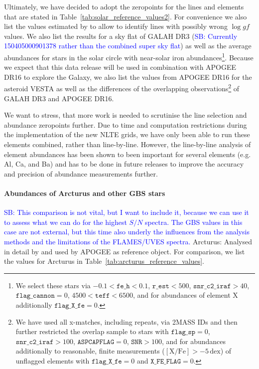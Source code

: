 \documentclass[fleqn,usenatbib,useAMS]{mnras}
\newcommand\SB[1]{\textcolor{blue}{SB: #1}}
\begin{document}
Ultimately, we have decided to adopt the zeropoints for the lines and elements that are stated in Table~\ref{tab:solar_reference_values2}. For convenience we also list the values estimated by \cite{Asplund2009} to allow to identify lines with possibly wrong $\log gf$ values. We also list the results for a sky flat of GALAH DR3 (\SB{Currently 150405000901378 rather than the combined super sky flat}) as well as the average abundances for stars in the solar circle with near-solar iron abundances\footnote{We select these stars via $-0.1 < \texttt{fe\_h} < 0.1$, $\texttt{r\_est} < 500$, $\texttt{snr\_c2\_iraf} > 40$, $\texttt{flag\_cannon} = 0$, $4500 < \texttt{teff} < 6500$, and for abundances of element X additionally $\texttt{flag\_X\_fe} = 0$.}. Because we expect that this data release will be used in combination with APOGEE DR16 to explore the Galaxy, we also list the values from APOGEE DR16 for the asteroid VESTA as well as the differences of the overlapping observations\footnote{We have used all x-matches, including repeats, via 2MASS IDs and then further restricted the overlap sample to stars with $\texttt{flag\_sp} = 0$, $\texttt{snr\_c2\_iraf} > 100$, $\texttt{ASPCAPFLAG} = 0$, $\texttt{SNR} > 100$, and for abundances additionally to reasonable, finite measurements ($\mathrm{[X/Fe]} > -5\,\mathrm{dex}$) of unflagged elements with $\texttt{flag\_X\_fe} = 0$ and $\texttt{X\_FE\_FLAG} = 0$.} of GALAH DR3 and APOGEE DR16.

We want to stress, that more work is needed to scrutinise the line selection and abundance zeropoints further. Due to time and computation restrictions during the implementation of the new NLTE grids, we have only been able to run these elements combined, rather than line-by-line. However, the line-by-line analysis of element abundances has been shown to been important for several elements (e.g. Al, Ca, and Ba) and has to be done in future releases to improve the accuracy and precision of abundance measurements further.

\paragraph*{Abundances of Arcturus and other GBS stars}

\SB{This comparison is not vital, but I want to include it, because we can use it to assess what we can do for the highest $S/N$ spectra. The GBS values in this case are not external, but this time also underly the influences from the analysis methods and the limitations of the FLAMES/UVES spectra.}
Arcturus: Analysed in detail by \citet{Ramirez2011} and used by APOGEE as reference object. For comparison, we list the values for Arcturus in Table~\ref{tab:arcturus_reference_values}.
\end{document}
